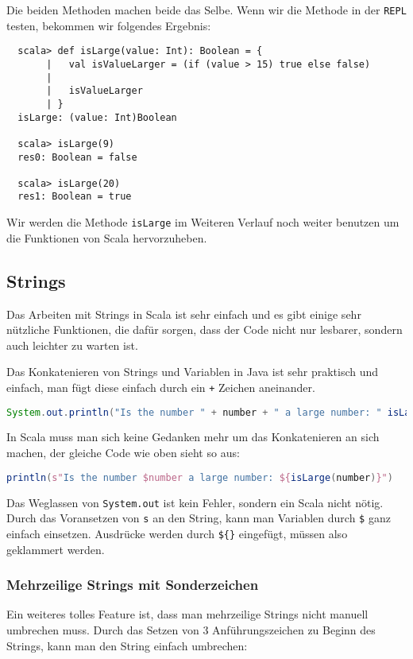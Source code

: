 Die beiden Methoden machen beide das Selbe. Wenn wir die Methode in der \texttt{REPL} testen, bekommen wir folgendes Ergebnis:

\begin{verbatim}
  scala> def isLarge(value: Int): Boolean = {
       |   val isValueLarger = (if (value > 15) true else false)
       |
       |   isValueLarger
       | }
  isLarge: (value: Int)Boolean

  scala> isLarge(9)
  res0: Boolean = false

  scala> isLarge(20)
  res1: Boolean = true
\end{verbatim}

Wir werden die Methode \texttt{isLarge} im Weiteren Verlauf noch weiter benutzen um die Funktionen von Scala hervorzuheben.

\subsection{Strings}

Das Arbeiten mit Strings in Scala ist sehr einfach und es gibt einige sehr nützliche Funktionen, die dafür sorgen, dass der Code nicht nur lesbarer, sondern auch leichter zu warten ist.

Das Konkatenieren von Strings und Variablen in Java ist sehr praktisch und einfach, man fügt diese einfach durch ein \texttt{+} Zeichen aneinander.

\begin{lstlisting}[language=Java,numbers=none]
System.out.println("Is the number " + number + " a large number: " isLarge(number));
\end{lstlisting}

In Scala muss man sich keine Gedanken mehr um das Konkatenieren an sich machen, der gleiche Code wie oben sieht so aus:

\begin{lstlisting}[language=Scala,numbers=none]
println(s"Is the number $number a large number: ${isLarge(number)}")
\end{lstlisting}

Das Weglassen von \texttt{System.out} ist kein Fehler, sondern ein Scala nicht nötig. Durch das Voransetzen von \texttt{s} an den String, kann man Variablen durch \texttt{\$} ganz einfach einsetzen. Ausdrücke werden durch \texttt{\$\{\}} eingefügt, müssen also geklammert werden.

\subsubsection{Mehrzeilige Strings mit Sonderzeichen}
Ein weiteres tolles Feature ist, dass man mehrzeilige Strings nicht manuell umbrechen muss. Durch das Setzen von 3 Anführungszeichen zu Beginn des Strings, kann man den String einfach umbrechen:

